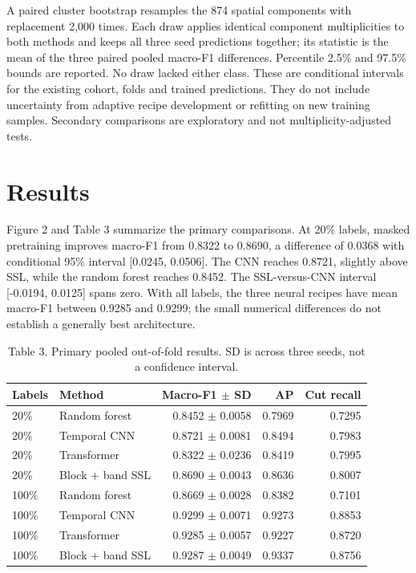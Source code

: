 \documentclass[11pt,a4paper]{article}
\begin{document}
A paired cluster bootstrap resamples the 874 spatial components with replacement 2,000 times. Each draw applies identical component multiplicities to both methods and keeps all three seed predictions together; its statistic is the mean of the three paired pooled macro-F1 differences. Percentile 2.5\% and 97.5\% bounds are reported. No draw lacked either class. These are conditional intervals for the existing cohort, folds and trained predictions. They do not include uncertainty from adaptive recipe development or refitting on new training samples. Secondary comparisons are exploratory and not multiplicity-adjusted tests.

\section{Results}
Figure 2 and Table 3 summarize the primary comparisons. At 20\% labels, masked pretraining improves macro-F1 from 0.8322 to 0.8690, a difference of 0.0368 with conditional 95\% interval [0.0245, 0.0506]. The CNN reaches 0.8721, slightly above SSL, while the random forest reaches 0.8452. The SSL-versus-CNN interval [-0.0194, 0.0125] spans zero. With all labels, the three neural recipes have mean macro-F1 between 0.9285 and 0.9299; the small numerical differences do not establish a generally best architecture.

\begin{table}[htbp]
\centering

\caption{Table 3. Primary pooled out-of-fold results. SD is across three seeds, not a confidence interval.}
\begin{tabular}{llrrr}
\toprule
Labels & Method & Macro-F1 $\pm$ SD & AP & Cut recall \\ \midrule
20\% & Random forest & 0.8452 $\pm$ 0.0058 & 0.7969 & 0.7295 \\
20\% & Temporal CNN & 0.8721 $\pm$ 0.0081 & 0.8494 & 0.7983 \\
20\% & Transformer & 0.8322 $\pm$ 0.0236 & 0.8419 & 0.7995 \\
20\% & Block + band SSL & 0.8690 $\pm$ 0.0043 & 0.8636 & 0.8007 \\
100\% & Random forest & 0.8669 $\pm$ 0.0028 & 0.8382 & 0.7101 \\
100\% & Temporal CNN & 0.9299 $\pm$ 0.0071 & 0.9273 & 0.8853 \\
100\% & Transformer & 0.9285 $\pm$ 0.0057 & 0.9227 & 0.8720 \\
100\% & Block + band SSL & 0.9287 $\pm$ 0.0049 & 0.9337 & 0.8756 \\
\bottomrule
\end{tabular}
\end{table}
\end{document}
